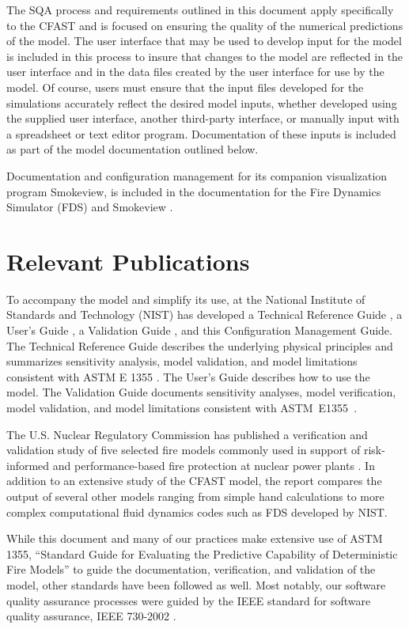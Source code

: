 \documentclass[12pt]{book}
\begin{document}
The SQA process and requirements outlined in this document apply specifically to the CFAST and is focused on ensuring the quality of the numerical predictions of the model.  The user interface that may be used to develop input for the model is included in this process to insure that changes to the model are reflected in the user interface and in the data files created by the user interface for use by the model.  Of course, users must ensure that the input files developed for the simulations accurately reflect the desired model inputs, whether developed using the supplied user interface, another third-party interface, or manually input with a spreadsheet or text editor program.  Documentation of these inputs is included as part of the model documentation outlined below.

Documentation and configuration management for its companion visualization program Smokeview, is included in the documentation for the Fire Dynamics Simulator (FDS) and Smokeview \cite{FDS_Configuration_Guide_6}.

\chapter{Relevant Publications}

To accompany the model and simplify its use, at the National Institute of Standards and Technology (NIST) has developed a Technical Reference Guide \cite{CFAST_Tech_Guide_7}, a User's Guide \cite{CFAST_Users_Guide_7}, a Validation Guide \cite{CFAST_Valid_Guide_7}, and this Configuration Management Guide.  The Technical Reference Guide describes the underlying physical principles and summarizes sensitivity analysis, model validation, and model limitations consistent with ASTM E 1355 \cite{ASTM:E1355}.  The User's Guide describes how to use the model.  The Validation Guide documents sensitivity analyses, model verification, model validation, and model limitations consistent with ASTM~E1355~\cite{ASTM:E1355}.

The U.S. Nuclear Regulatory Commission has published a verification and validation study of five selected fire models commonly used in support of risk-informed and performance-based fire protection at nuclear power plants \cite{NRCNUREG1824}. In addition to an extensive study of the CFAST model, the report compares the output of several other models ranging from simple hand calculations to more complex computational fluid dynamics codes such as FDS developed by NIST.

While this document and many of our practices make extensive use of ASTM 1355, ``Standard Guide for Evaluating the Predictive Capability of Deterministic Fire Models'' \cite{ASTM:E1355} to guide the documentation, verification, and validation of the model, other standards have been followed as well.  Most notably, our software quality assurance processes were guided by the IEEE standard for software quality assurance, IEEE 730-2002 \cite{IEEE:730}.
\end{document}

